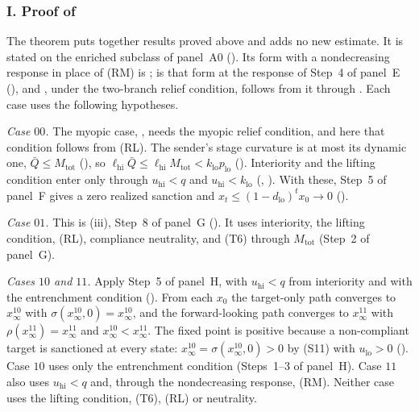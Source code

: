 \subsubsection*{I. Proof of }

The theorem puts together results proved above and adds no new estimate. It is
stated on the enriched subclass of panel~A0 (). Its
form with a nondecreasing response in place of (RM) is
;  is
that form at the response of Step~4 of panel~E
(), and
, under the two-branch relief condition, follows from it
through . Each case uses the following hypotheses.

\emph{Case $00$.} The myopic case, , needs the
myopic relief condition, and here that condition follows from (RL). The sender's stage
curvature is at most its dynamic one, $\bar Q\le M_{\mathrm{tot}}$
(), so
$\ell_{\mathrm{hi}}\bar Q\le\ell_{\mathrm{hi}}M_{\mathrm{tot}}<k_{\mathrm{lo}}p_{\mathrm{lo}}$
(). Interiority and the lifting condition enter only
through $u_{\mathrm{hi}}<q$ and $u_{\mathrm{hi}}<k_{\mathrm{lo}}$
(, ). With these, Step~5 of panel~F gives a zero
realized sanction and $x_t\le(1-d_{\mathrm{lo}})^tx_0\to0$
().

\emph{Case $01$.} This is (iii), Step~8 of panel~G
(). It uses interiority, the lifting condition, (RL),
compliance neutrality, and (T6) through $M_{\mathrm{tot}}$ (Step~2 of
panel~G).

\emph{Cases $10$ and $11$.} Apply Step~5 of panel~H, with $u_{\mathrm{hi}}<q$
from interiority and with the entrenchment condition
(). From each $x_0$
the target-only path converges to $x^{10}_\infty$ with $\sigma(x^{10}_\infty,0)=x^{10}_\infty$, and
the forward-looking path converges to $x^{11}_\infty$ with $\rho(x^{11}_\infty)=x^{11}_\infty$ and $x^{10}_\infty<x^{11}_\infty$. The
fixed point is positive because a non-compliant target is sanctioned at every state:
$x^{10}_\infty=\sigma(x^{10}_\infty,0)>0$ by (S11) with $u_{\mathrm{lo}}>0$
(). Case $10$ uses only the entrenchment condition (Steps~1--3 of
panel~H). Case $11$ also uses $u_{\mathrm{hi}}<q$ and, through the nondecreasing
response, (RM). Neither case uses the lifting condition, (T6), (RL) or neutrality.

